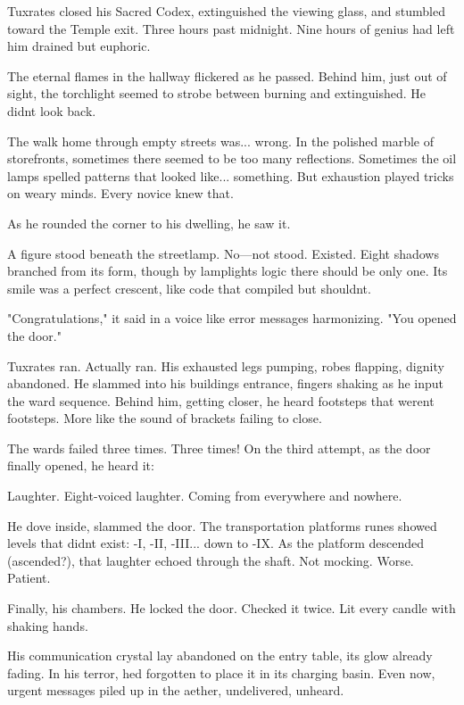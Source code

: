 Tuxrates closed his Sacred Codex, extinguished the viewing glass, and stumbled toward the Temple exit. Three hours past midnight. Nine hours of genius had left him drained but euphoric.

The eternal flames in the hallway flickered as he passed. Behind him, just out of sight, the torchlight seemed to strobe between burning and extinguished. He didn\textquotesingle t look back.

The walk home through empty streets was... wrong. In the polished marble of storefronts, sometimes there seemed to be too many reflections. Sometimes the oil lamps spelled patterns that looked like... something. But exhaustion played tricks on weary minds. Every novice knew that.

As he rounded the corner to his dwelling, he saw it.

A figure stood beneath the streetlamp. No---not stood. Existed. Eight shadows branched from its form, though by lamplight\textquotesingle s logic there should be only one. Its smile was a perfect crescent, like code that compiled but shouldn\textquotesingle t.

"Congratulations," it said in a voice like error messages harmonizing. "You opened the door."

Tuxrates ran. Actually ran. His exhausted legs pumping, robes flapping, dignity abandoned. He slammed into his building\textquotesingle s entrance, fingers shaking as he input the ward sequence. Behind him, getting closer, he heard footsteps that weren\textquotesingle t footsteps. More like the sound of brackets failing to close.

The wards failed three times. Three times! On the third attempt, as the door finally opened, he heard it:

Laughter. Eight-voiced laughter. Coming from everywhere and nowhere.

He dove inside, slammed the door. The transportation platform\textquotesingle s runes showed levels that didn\textquotesingle t exist: -I, -II, -III... down to -IX. As the platform descended (ascended?), that laughter echoed through the shaft. Not mocking. Worse. Patient.

Finally, his chambers. He locked the door. Checked it twice. Lit every candle with shaking hands.

His communication crystal lay abandoned on the entry table, its glow already fading. In his terror, he\textquotesingle d forgotten to place it in its charging basin. Even now, urgent messages piled up in the aether, undelivered, unheard.


